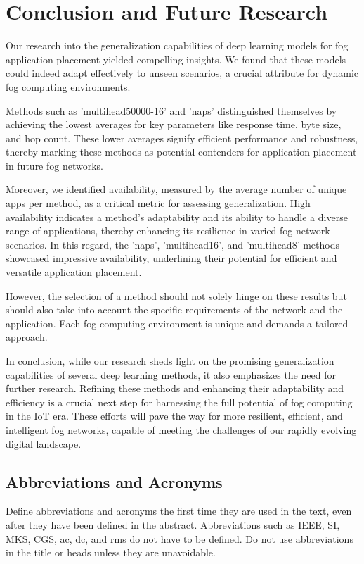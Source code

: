 \documentclass[conference]{IEEEtran}
\begin{document}
\section{Conclusion and Future Research}

Our research into the generalization capabilities of deep learning models for fog application placement yielded compelling insights. We found that these models could indeed adapt effectively to unseen scenarios, a crucial attribute for dynamic fog computing environments.

Methods such as 'multihead50000-16' and 'naps' distinguished themselves by achieving the lowest averages for key parameters like response time, byte size, and hop count. These lower averages signify efficient performance and robustness, thereby marking these methods as potential contenders for application placement in future fog networks.

Moreover, we identified availability, measured by the average number of unique apps per method, as a critical metric for assessing generalization. High availability indicates a method's adaptability and its ability to handle a diverse range of applications, thereby enhancing its resilience in varied fog network scenarios. In this regard, the 'naps', 'multihead16', and 'multihead8' methods showcased impressive availability, underlining their potential for efficient and versatile application placement.

However, the selection of a method should not solely hinge on these results but should also take into account the specific requirements of the network and the application. Each fog computing environment is unique and demands a tailored approach.

In conclusion, while our research sheds light on the promising generalization capabilities of several deep learning methods, it also emphasizes the need for further research. Refining these methods and enhancing their adaptability and efficiency is a crucial next step for harnessing the full potential of fog computing in the IoT era. These efforts will pave the way for more resilient, efficient, and intelligent fog networks, capable of meeting the challenges of our rapidly evolving digital landscape.

\subsection{Abbreviations and Acronyms}\label{AA}
Define abbreviations and acronyms the first time they are used in the text, 
even after they have been defined in the abstract. Abbreviations such as 
IEEE, SI, MKS, CGS, ac, dc, and rms do not have to be defined. Do not use 
abbreviations in the title or heads unless they are unavoidable.
\end{document}
